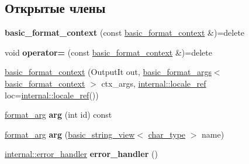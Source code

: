 \subsection*{Открытые члены}
\begin{DoxyCompactItemize}
\item 
\mbox{\label{classbasic__format__context_a164709f82ae7eed798a09f525d5e041f}} 
{\bfseries basic\+\_\+format\+\_\+context} (const \hyperlink{classbasic__format__context}{basic\+\_\+format\+\_\+context} \&)=delete
\item 
\mbox{\label{classbasic__format__context_afab7218b916beac865dc751679fd03a9}} 
void {\bfseries operator=} (const \hyperlink{classbasic__format__context}{basic\+\_\+format\+\_\+context} \&)=delete
\item 
\hyperlink{classbasic__format__context_a545b2e17dfec6a57d19ff8f957b1b4fc}{basic\+\_\+format\+\_\+context} (Output\+It out, \hyperlink{classbasic__format__args}{basic\+\_\+format\+\_\+args}$<$ \hyperlink{classbasic__format__context}{basic\+\_\+format\+\_\+context} $>$ ctx\+\_\+args, \hyperlink{classinternal_1_1locale__ref}{internal\+::locale\+\_\+ref} loc=\hyperlink{classinternal_1_1locale__ref}{internal\+::locale\+\_\+ref}())
\item 
\mbox{\label{classbasic__format__context_aa31f8f9e4f24b50f1c7a45b42a51f91d}} 
\hyperlink{classbasic__format__arg}{format\+\_\+arg} {\bfseries arg} (int id) const
\item 
\mbox{\label{classbasic__format__context_ade59ef8b902a669cefbf3beab05363a3}} 
\hyperlink{classbasic__format__arg}{format\+\_\+arg} {\bfseries arg} (\hyperlink{classbasic__string__view}{basic\+\_\+string\+\_\+view}$<$ \hyperlink{classbasic__format__context_a71fea7d34edb618df612644dfd02a896}{char\+\_\+type} $>$ name)
\item 
\mbox{\label{classbasic__format__context_ac3e6d9b4fe83cac921bec43606ad3d9c}} 
\hyperlink{structinternal_1_1error__handler}{internal\+::error\+\_\+handler} {\bfseries error\+\_\+handler} ()
\item 
\mbox{\label{classbasic__format__context_a76291cdb1ca503de067d32d93ba3b50e}} 

\end{DoxyCompactItemize}
